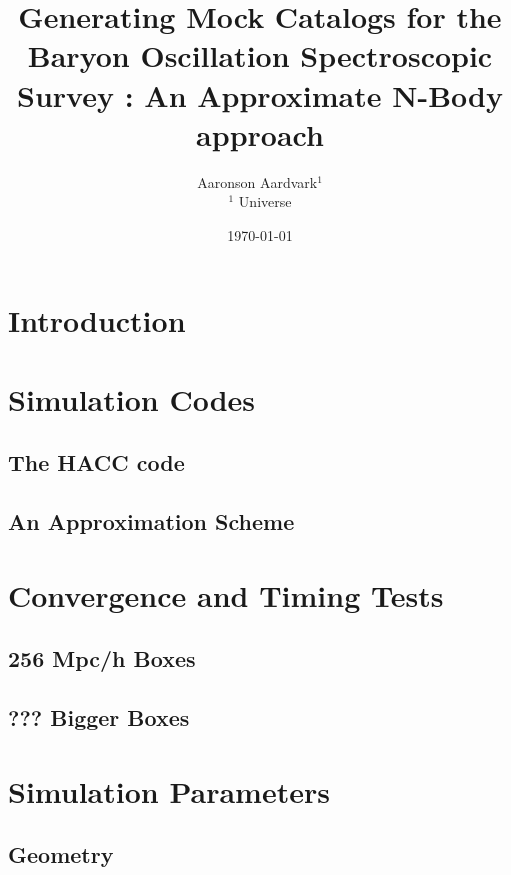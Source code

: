 \documentclass[usenatbib]{mn2e}
\begin{document}
\topmargin-1cm

\newcommand{\bd}{{\bm \delta}}


\title[Mock catalogs for BOSS]
{Generating Mock Catalogs for the Baryon Oscillation Spectroscopic Survey : An Approximate N-Body approach}
\author[People??]{Aaronson Aardvark$^{1}$ \\
$^{1}$ Universe \\
}

\date{\today}
\maketitle

\begin{abstract}
\end{abstract}

\section{Introduction}



\section{Simulation Codes}

\subsection{The HACC code}


\subsection{An Approximation Scheme}


\section{Convergence and Timing Tests}

\subsection{256 Mpc/h Boxes}


\subsection{??? Bigger Boxes}

\section{Simulation Parameters}

\subsection{Geometry}
\end{document}
